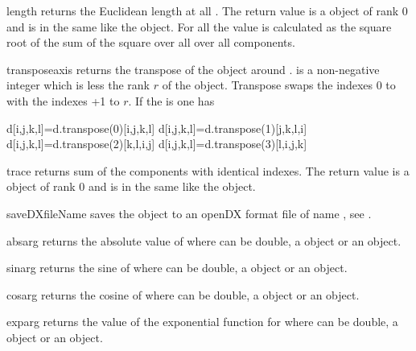 \begin{funcdesc}{length}{}
returns the Euclidean length at all \DataSamplePoints. The
return value is a \Data object of rank 0 
and is in the same
\FunctionSpace like the object. For all \DataSamplePoints
the value is calculated as the square root of the sum of the square over all over all components. 
\end{funcdesc}
\begin{funcdesc}{transpose}{axis}
returns the transpose of the object around .  is a non-negative integer
which is less the rank $r$ of the object. Transpose swaps the indexes $0$ to 
with the indexes +1 to $r$. If the  is \RankFour one has 
\begin{python}
d[i,j,k,l]=d.transpose(0)[i,j,k,l]
d[i,j,k,l]=d.transpose(1)[j,k,l,i]
d[i,j,k,l]=d.transpose(2)[k,l,i,j]
d[i,j,k,l]=d.transpose(3)[l,i,j,k]
\end{python}
\end{funcdesc}

\begin{funcdesc}{trace}{}
returns sum of the components with identical indexes. 
The
return value is a \Data object of rank 0 
and is in the same
\FunctionSpace like the object.
\end{funcdesc}
\begin{funcdesc}{saveDX}{fileName}
saves the object to an openDX format file of name , see
.  
\end{funcdesc}


\begin{funcdesc}{abs}{arg} 
returns the absolute value of  where 
can be double, a \Data object or an \numarray object.
\end{funcdesc}

\begin{funcdesc}{sin}{arg}
returns the sine of  where 
can be double, a \Data object or an \numarray object.
\end{funcdesc}

\begin{funcdesc}{cos}{arg}
returns the cosine of  where 
can be double, a \Data object or an \numarray object.
\end{funcdesc}

\begin{funcdesc}{exp}{arg}
returns the value of the exponential function for  where 
can be double, a \Data object or an \numarray object.
\end{funcdesc}

